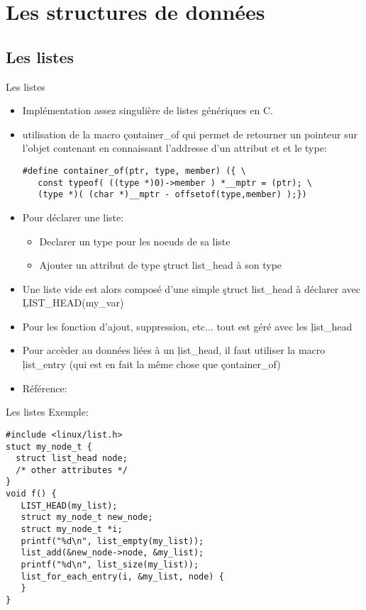 \section{Les structures de données}

\subsection{Les listes}

\begin{frame}[fragile=singleslide]{Les listes}
  \begin{itemize} 
  \item Implémentation assez singulière de listes génériques en C. 
  \item  utilisation  de  la  macro  \c{container_of}  qui  permet  de
    retourner  un  pointeur   sur  l'objet  contenant  en  connaissant
    l'addresse d'un attribut et et le type:
    \begin{lstlisting} 
#define container_of(ptr, type, member) ({ \ 
   const typeof( ((type *)0)->member ) *__mptr = (ptr); \
   (type *)( (char *)__mptr - offsetof(type,member) );})
    \end{lstlisting} 
  \item Pour déclarer une liste: 
    \begin{itemize}
    \item Declarer un type pour les noeuds de sa liste
    \item Ajouter un attribut de type \c{struct list_head} à son type
    \end{itemize} 
  \item   Une   liste   vide    est   alors   composé   d'une   simple
    \c{struct list_head} à déclarer avec \c{LIST_HEAD(my_var)}
  \item Pour  les fonction d'ajout, suppression, etc...  tout est géré
    avec les \c{list_head}
  \item  Pour accèder  au données  liées à  un \c{list_head},  il faut
    utiliser la  macro \c{list_entry} (qui  est en fait la  même chose
    que \c{container_of})
  \item Référence: \file{linux/list.h}
  \end{itemize}  
\end{frame}

\begin{frame}[fragile=singleslide]{Les listes}
  Exemple: 
    \begin{lstlisting}
#include <linux/list.h>
stuct my_node_t {
  struct list_head node;
  /* other attributes */
}
void f() {
   LIST_HEAD(my_list);
   struct my_node_t new_node; 
   struct my_node_t *i; 
   printf("%d\n", list_empty(my_list));
   list_add(&new_node->node, &my_list);
   printf("%d\n", list_size(my_list));
   list_for_each_entry(i, &my_list, node) {
   }
} 
    \end{lstlisting} 
\end{frame} 

